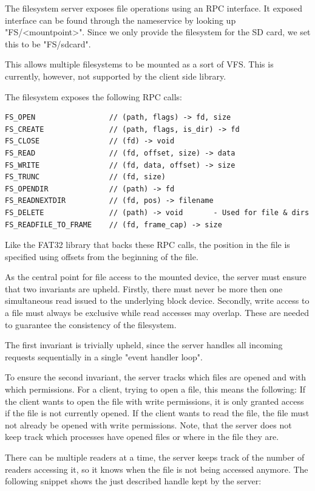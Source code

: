 The filesystem server exposes file operations using an RPC interface.
It exposed interface can be found through the nameservice by looking up "FS/<mountpoint>".
Since we only provide the filesystem for the SD card, we set this to be "FS/sdcard".

This allows multiple filesystems to be mounted as a sort of VFS.
This is currently, however, not supported by the client side library.

The filesystem exposes the following RPC calls:
\begin{verbatim}
FS_OPEN                 // (path, flags) -> fd, size
FS_CREATE               // (path, flags, is_dir) -> fd
FS_CLOSE                // (fd) -> void
FS_READ                 // (fd, offset, size) -> data
FS_WRITE                // (fd, data, offset) -> size
FS_TRUNC                // (fd, size)
FS_OPENDIR              // (path) -> fd
FS_READNEXTDIR          // (fd, pos) -> filename
FS_DELETE               // (path) -> void       - Used for file & dirs
FS_READFILE_TO_FRAME    // (fd, frame_cap) -> size
\end{verbatim}

Like the FAT32 library that backs these RPC calls, the position in the file is
specified using offsets from the beginning of the file.

As the central point for file access to the mounted device, the server must ensure that two invariants are upheld.
Firstly, there must never be more then one simultaneous read issued to the underlying block device.
Secondly, write access to a file must always be exclusive while read accesses may overlap.
These are needed to guarantee the consistency of the filesystem.

The first invariant is trivially upheld, since the server handles all incoming requests sequentially in a single "event handler loop".

To ensure the second invariant, the server tracks which files are opened and
with which permissions.
For a client, trying to open a file, this means the following:
If the client wants to open the file with write permissions, it is only granted
access if the file is not currently opened.
If the client wants to read the file, the file must not already be opened with
write permissions.
Note, that the server does not keep track which processes have opened files or
where in the file they are. 

There can be multiple readers at a time, the server keeps track of the number of
readers accessing it, so it knows when the file is not being accessed anymore.
The following snippet shows the just described handle kept by the server:

